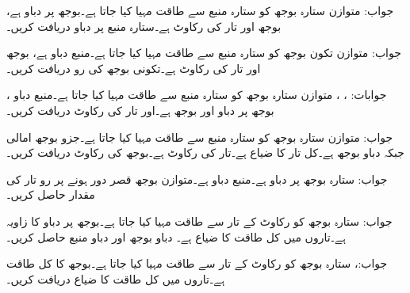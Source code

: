 جواب: 
متوازن ستارہ بوجھ کو ستارہ منبع  سے طاقت مہیا کیا جاتا ہے۔بوجھ پر دباو   ہے، بوجھ
  اور تار کی رکاوٹ  ہے۔ستارہ منبع پر دباو  دریافت کریں۔

جواب: 
متوازن تکون بوجھ کو ستارہ منبع  سے طاقت مہیا کیا جاتا ہے۔منبع دباو   ہے، بوجھ
  اور تار کی رکاوٹ  ہے۔تکونی بوجھ کی رو دریافت کریں۔

جوابات: ،  ،  
متوازن ستارہ بوجھ کو ستارہ منبع  سے طاقت مہیا کیا جاتا ہے۔منبع دباو  ، بوجھ پر دباو
  اور بوجھ   ہے۔اور تار کی رکاوٹ  دریافت کریں۔

جواب: 
متوازن ستارہ بوجھ کو ستارہ منبع  سے طاقت مہیا کیا جاتا ہے۔جزو بوجھ  امالی  جبکہ دباو  بوجھ  ہے۔کل تار کا ضیاع  ہے۔تار کی رکاوٹ  ہے۔بوجھ کی رکاوٹ دریافت کریں۔

جواب:
ستارہ بوجھ  پر دباو  ہے۔منبع 
دباو ہے۔متوازن بوجھ قصر دور ہونے پر رو تار کی مقدار حاصل کریں۔

جواب:
ستارہ بوجھ  کو  رکاوٹ کے تار سے طاقت مہیا کیا جاتا ہے۔بوجھ پر دباو کا زاویہ  ہے۔تاروں میں کل طاقت کا ضیاع  ہے۔ دباو بوجھ اور دباو منبع حاصل کریں۔

جواب:، 
ستارہ بوجھ  کو  رکاوٹ کے تار سے طاقت مہیا کیا جاتا ہے۔بوجھ کا کل طاقت  ہے۔تاروں میں کل طاقت کا ضیاع دریافت کریں۔

